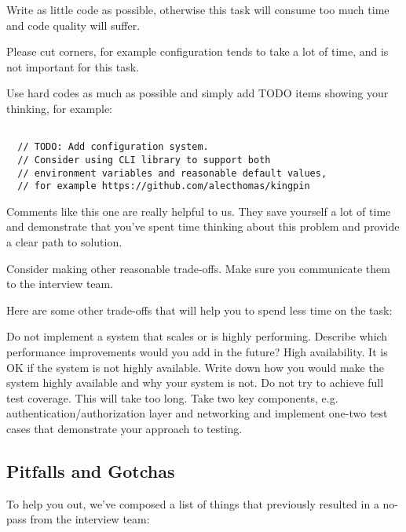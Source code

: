 \documentclass{article}
\begin{document}
Write as little code as possible, otherwise this task will consume too much time and code quality will suffer.

Please cut corners, for example configuration tends to take a lot of time, and is not important for this task.

Use hard codes as much as possible and simply add TODO items showing your thinking, for example:

\begin{lstlisting}[caption=TODO example]
  
  // TODO: Add configuration system.
  // Consider using CLI library to support both
  // environment variables and reasonable default values,
  // for example https://github.com/alecthomas/kingpin

\end{lstlisting}

Comments like this one are really helpful to us.
They save yourself a lot of time and demonstrate that you've spent time thinking about this problem and provide a clear path to solution.

Consider making other reasonable trade-offs. Make sure you communicate them to the interview team.

Here are some other trade-offs that will help you to spend less time on the task:


Do not implement a system that scales or is highly performing. Describe which performance improvements would you add in the future?
High availability. It is OK if the system is not highly available. Write down how you would make the system highly available and why your system is not.
Do not try to achieve full test coverage. This will take too long. Take two key components, e.g. authentication/authorization layer and networking and implement one-two test cases that demonstrate your approach to testing.


\subsection{Pitfalls and Gotchas}
    
  To help you out, we've composed a list of things that previously resulted in a no-pass from the interview team:
\end{document}
